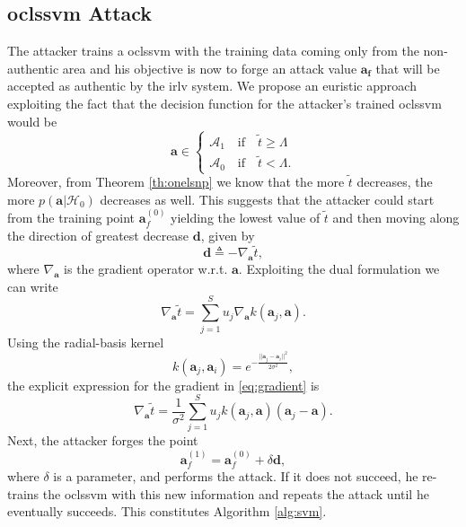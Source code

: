 \documentclass[draftcls,onecolumn,12pt]{IEEEtran}
\newcommand{\wrt}{w.r.t. }
\begin{document}
\subsection{\Acl{oclssvm} Attack}
The attacker trains a \ac{oclssvm} with the training data coming only from the non-authentic area and his objective is now to forge an attack value $\bm{a_{f}}$ that will be accepted as authentic by the \ac{irlv} system. We propose an euristic approach  exploiting the fact that the decision function for the attacker's trained \ac{oclssvm} would be
\begin{equation}
\bm{a} \in
	\begin{cases}
		\mathcal{A}_1 \quad \text{if} \quad \tilde{t} \geq \Lambda \\
		\mathcal{A}_0 \quad \text{if} \quad \tilde{t} < \Lambda.
	\end{cases}	
\end{equation} 
Moreover, from Theorem \ref{th:onelsnp} we know that the more $\tilde{t}$ decreases, the more $p(\bm{a}|\mathcal{H}_0)$ decreases as well.
This suggests that the attacker could start from the training point $\bm{a}_{f}^{(0)}$ yielding the lowest value of $\tilde{t}$ and then moving along the direction of greatest decrease $\bm{d}$, given by
\begin{equation}
\label{eq:dDef}
	\bm{d} \triangleq - \nabla_{\bm{a}} \tilde{t},
\end{equation} 
where $\nabla_{\bm{a}}$ is the gradient operator \wrt $\bm{a}$. Exploiting the dual formulation \cite{choi2009least} we can write
\begin{equation}
\label{eq:gradient}
		\nabla_{\bm{a}} \tilde{t} = \sum_{j=1}^{S} u_j \nabla_{\bm{a}} k(\bm{a}_j,\bm{a}).
\end{equation}
Using the radial-basis kernel
\begin{equation}
k(\bm{a}_j,\bm{a}_i) = e^{-\frac{||\bm{a}_j-\bm{a}_i||^2}{2\sigma^2}},
\end{equation}
the explicit expression for the gradient in \eqref{eq:gradient} is
\begin{equation}
	\nabla_{\bm{a}} \tilde{t} =\frac{1}{\sigma^2} \sum_{j=1}^{S} u_j k(\bm{a}_j,\bm{a}) (\bm{a}_j - \bm{a}).
\end{equation}
Next, the attacker forges the point
\begin{equation}
	\bm{a}_f^{(1)} = \bm{a}_f^{(0)} + \delta \bm{d}, 	
\end{equation}
where $\delta$ is a parameter, and performs the attack. If it does not succeed, he re-trains the \ac{oclssvm} with this new information and repeats the attack until he eventually succeeds. This constitutes Algorithm \ref{alg:svm}.
\end{document}
